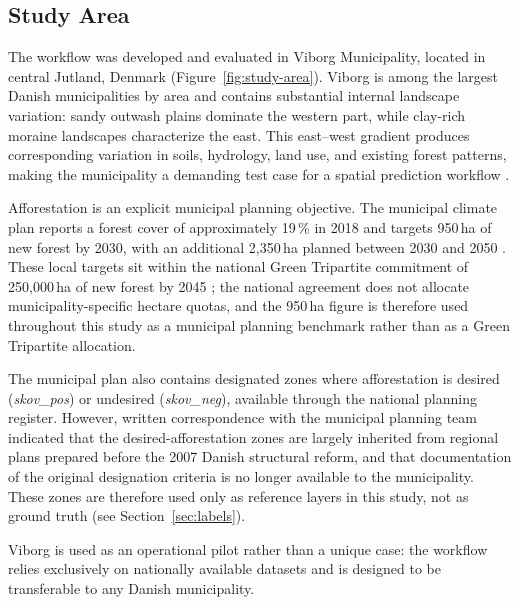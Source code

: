 \documentclass[land,article,submit,moreauthors]{Definitions/mdpi}
\begin{document}
\subsection{Study Area}
\label{sec:study-area}

The workflow was developed and evaluated in Viborg Municipality, located in central Jutland, Denmark (Figure~\ref{fig:study-area}). Viborg is among the largest Danish municipalities by area and contains substantial internal landscape variation: sandy outwash plains dominate the western part, while clay-rich moraine landscapes characterize the east. This east--west gradient produces corresponding variation in soils, hydrology, land use, and existing forest patterns, making the municipality a demanding test case for a spatial prediction workflow \citep{sorensen2024}.

Afforestation is an explicit municipal planning objective. The municipal climate plan reports a forest cover of approximately 19\,\% in 2018 and targets 950\,ha of new forest by 2030, with an additional 2{,}350\,ha planned between 2030 and 2050 \citep{viborg2022}. These local targets sit within the national Green Tripartite commitment of 250{,}000\,ha of new forest by 2045 \citep{regeringen2024a}; the national agreement does not allocate municipality-specific hectare quotas, and the 950\,ha figure is therefore used throughout this study as a municipal planning benchmark rather than as a Green Tripartite allocation.

The municipal plan also contains designated zones where afforestation is desired (\textit{skov\_pos}) or undesired (\textit{skov\_neg}), available through the national planning register. However, written correspondence with the municipal planning team indicated that the desired-afforestation zones are largely inherited from regional plans prepared before the 2007 Danish structural reform, and that documentation of the original designation criteria is no longer available to the municipality. These zones are therefore used only as reference layers in this study, not as ground truth (see Section~\ref{sec:labels}).

Viborg is used as an operational pilot rather than a unique case: the workflow relies exclusively on nationally available datasets and is designed to be transferable to any Danish municipality.
\end{document}
